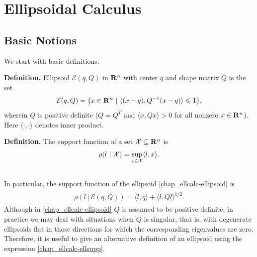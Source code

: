 \documentclass[letterpaper,10pt,english]{sphinxmanual}
\begin{document}
\chapter{Ellipsoidal Calculus}
\label{chap_ellcalc:ellipsoidal-calculus}\label{chap_ellcalc::doc}

\section{Basic Notions}
\label{chap_ellcalc:basic-notions}
We start with basic definitions.

\textbf{Definition.} Ellipsoid ${\mathcal E}(q,Q)$ in
${\bf R}^n$ with center $q$ and shape matrix $Q$ is
the set
\label{chap_ellcalc:equation-ellipsoid}\begin{gather}
\begin{split}{\mathcal E}(q,Q) = \{ x \in {\bf R}^n ~|~ \langle (x-q), Q^{-1}(x-q)\rangle\leqslant1 \},\end{split}\label{chap_ellcalc-ellipsoid}
\end{gather}
wherein $Q$ is positive definite ($Q=Q^T$ and
$\langle x, Qx\rangle>0$ for all nonzero $x\in{\bf R}^n$).
Here $\langle\cdot,\cdot\rangle$ denotes inner
product.

\textbf{Definition.} The support function of a set
${\mathcal X}\subseteq{\bf R}^n$ is
\begin{gather}
\begin{split}\rho(l~|~{\mathcal X}) = \sup_{x\in{\mathcal X}} \langle l,x\rangle.\end{split}\notag\\\begin{split}\end{split}\notag
\end{gather}
In particular, the support function of the ellipsoid \eqref{chap_ellcalc-ellipsoid} is
\label{chap_ellcalc:equation-ellsupp}\begin{gather}
\begin{split}\rho(l~|~{\mathcal E}(q,Q)) = \langle l, q\rangle + \langle l, Ql\rangle^{1/2}.\end{split}\label{chap_ellcalc-ellsupp}
\end{gather}
Although in \eqref{chap_ellcalc-ellipsoid} $Q$ is assumed to be positive definite,
in practice we may deal with situations when $Q$ is singular, that
is, with degenerate ellipsoids flat in those directions for which the
corresponding eigenvalues are zero. Therefore, it is useful to give an
alternative definition of an ellipsoid using the expression \eqref{chap_ellcalc-ellsupp}.
\end{document}
